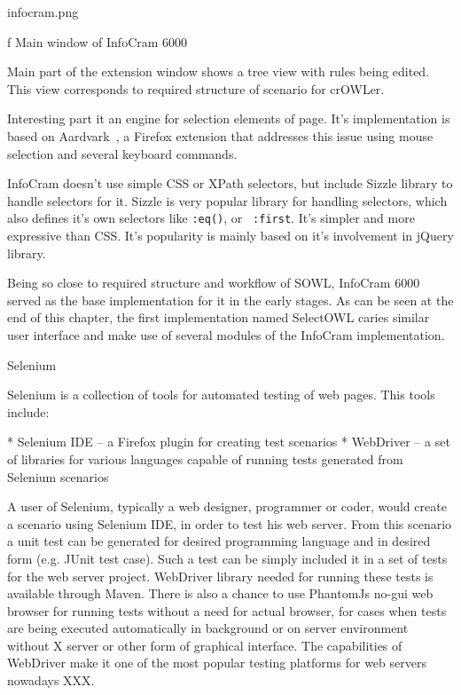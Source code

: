 \midinsert
\picw=7cm \cinspic infocram.png
\caption/f Main window of InfoCram 6000
\endinsert

Main part of the extension window shows a tree view with rules being edited.
This view corresponds to required structure of scenario for crOWLer. 

Interesting part it an engine for selection elements of page. It's
implementation is based on
Aardvark~, a
Firefox extension that addresses this issue using mouse selection and several
keyboard commands. 

InfoCram doesn't use simple CSS or XPath selectors, but include Sizzle library
to handle selectors for it. Sizzle is very popular library for handling
selectors, which also defines it's own selectors like {\tt :eq()}, or {\tt
:first}. It's simpler and more expressive than CSS. It's popularity is 
mainly based on it's involvement in jQuery library. 

Being so close to required structure and workflow of SOWL, InfoCram 6000 served
as the base implementation for it in the early stages. As can be seen at the end 
of this chapter, the first implementation named SelectOWL caries similar user
interface and make use of several modules of the InfoCram implementation. 


\secc Selenium

Selenium is a collection of tools for automated testing of web pages. This tools include: 

\begitems
  * Selenium IDE -- a Firefox plugin for creating test scenarios
  * WebDriver -- a set of libraries for various languages capable of running
    tests generated from Selenium scenarios
\enditems

A user of Selenium, typically a web designer, programmer or coder, would create
a scenario using Selenium IDE, in order to test his web server. From this
scenario a unit test can be generated for desired programming language and in
desired form (e.g. JUnit test case). Such a test can be simply included it in a
set of tests for the web server project. WebDriver library needed for running
these tests is available through Maven. There is also a chance to use PhantomJs
no-gui web browser for running tests without a need for actual browser, for
cases when tests are being executed automatically in background or on server
environment without X server or other form of graphical interface. The
capabilities of WebDriver make it one of the most popular testing platforms for
web servers nowadays XXX. 

